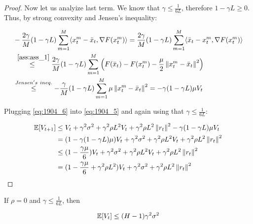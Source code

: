 \begin{proof}
    Now let us analyize last term. We know that $\gamma \leq \frac{1}{6L}$, therefore $1 - \gamma L \geq 0$. Thus, by strong convexity and Jensen's inequality:

    \begin{align}
        &- \frac{2\gamma}{M}(1 - \gamma L) \summ{m=1}{M} \inner{x^m_t - \bar{x}_t}{\nabla F(x^m_t)} 
        =
        \frac{2\gamma}{M}(1 - \gamma L) \summ{m=1}{M} \inner{\bar{x}_t - x^m_t}{\nabla F(x^m_t)} \\
        &\overset{~\ref{ass:ass_1}}{\leq}
        \frac{2\gamma}{M}(1 - \gamma L) \summ{m=1}{M} \left(F(\bar{x}_t) - F(x^m_t) - \frac{\mu}{2} \norm{x^m_t - \bar{x}_t}^2 \right) \\
        &\overset{Jensen's \ ineq.}{\leq}
        - \frac{\gamma}{M}(1 - \gamma L) \summ{m=1}{M} \mu \norm{x^m_t - \bar{x}_t}^2 
        =
        - \gamma (1 - \gamma L) \mu V_t
        \label{eq:1904_6}
    \end{align}

    Plugging \eqref{eq:1904_6} into \eqref{eq:1904_5} and again using that $\gamma \leq \frac{1}{6L}$:

    \begin{align}
        \E [V_{t+1}]
        &\leq
        V_t 
        + \gamma^2 \sigma^2 + \gamma^2 \rho L^2 V_t + \gamma^2 \rho L^2 \norm{r_t}^2
        - \gamma (1 - \gamma L) \mu V_t \\
        &=
        (1 - \gamma (1 - \gamma L) \mu) V_t
        + \gamma^2 \sigma^2 + \gamma^2 \rho L^2 V_t + \gamma^2 \rho L^2 \norm{r_t}^2 \\
        &\leq
        (1 - \frac {\gamma \mu}{6}) V_t
        + \gamma^2 \sigma^2 + \gamma^2 \rho L^2 V_t + \gamma^2 \rho L^2 \norm{r_t}^2 \\
        &=
        (1 - \frac {\gamma \mu}{6} + \gamma^2 \rho L^2) V_t
        +  \gamma^2 \sigma^2 + \gamma^2 \rho L^2 \norm{r_t}^2
        \label{eq:1904_7} 
    \end{align}     
\end{proof}

\begin{sublemma} \label{sublem:vt=0}
If $\rho = 0$ and $\gamma \leq \frac{1}{6L}$, then

    \begin{align}
        \mathbb{E} [V_t] 
        \leq
         (H-1) \gamma^2 \sigma^2
    \end{align}

\end{sublemma}

